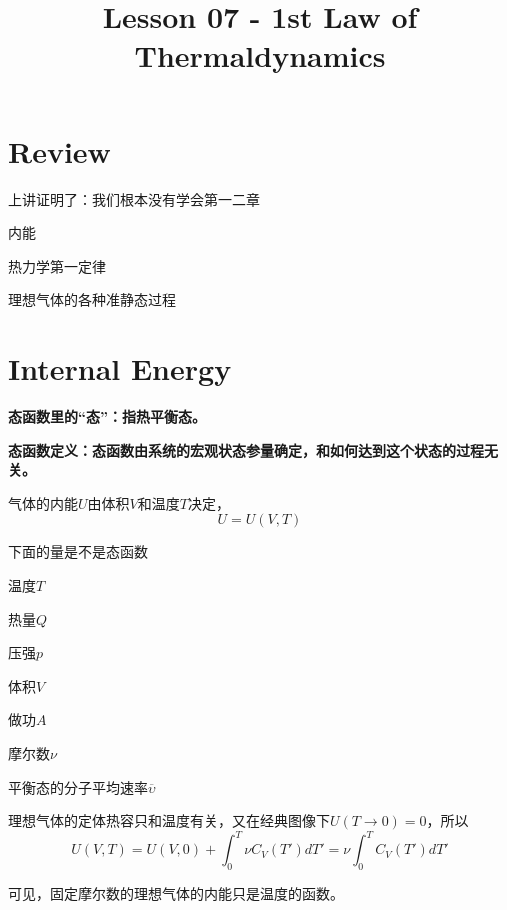 \documentclass[CJK]{beamer}
\title{Lesson 07 - 1st Law of Thermaldynamics}
\author{}
\date{}
\begin{document}


\section{Review}

\begin{frame}
\bch
\bitem
\item{上讲证明了：我们根本没有学会第一二章}
\eitem
\ech
\end{frame}

\begin{frame}
\bch
\bitem
\item{内能}
\item{热力学第一定律}
\item{理想气体的各种准静态过程}
\eitem
\ech
\end{frame}


\section{Internal Energy}

\begin{frame}
\bch
\bitem
\item{\bf 态函数里的“态”：指热平衡态。}
\item{\bf 态函数定义：态函数由系统的宏观状态参量确定，和如何达到这个状态的过程无关。}
\eitem

\bex
气体的内能$U$由体积$V$和温度$T$决定，
$$ U  = U(V, T)$$
\eex

\ech
\end{frame}

\begin{frame}
\bch
下面的量是不是态函数
\bitem
\item{温度$T$}
\item{热量$Q$}
\item{压强$p$}
\item{体积$V$}
\item{做功$A$}
\item{摩尔数$\nu$}
\item{平衡态的分子平均速率$\overline{\upsilon}$}
\eitem
\ech
\end{frame}

\begin{frame}
\bch
理想气体的定体热容只和温度有关，又在经典图像下$U(T\rightarrow 0) = 0$，所以
$$ U(V, T) = U(V, 0) + \int_0^T \nu C_V(T') dT' =\nu  \int_0^T C_V(T') dT'  $$

可见，固定摩尔数的理想气体的内能只是温度的函数。
\ech
\end{frame}
\end{document}
